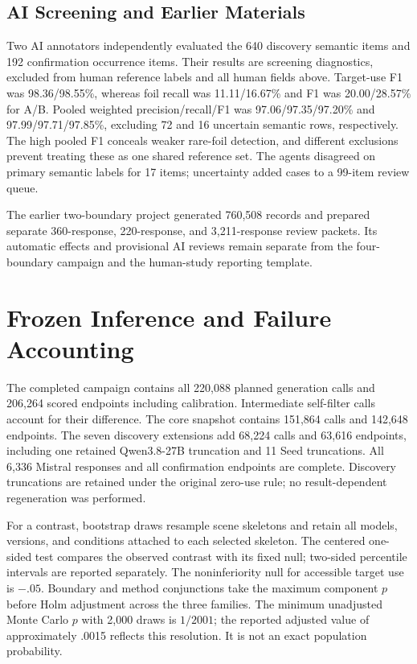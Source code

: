 \subsection{AI Screening and Earlier Materials}
Two AI annotators independently evaluated the 640 discovery semantic items and 192 confirmation occurrence items. Their results are screening diagnostics, excluded from human reference labels and all human fields above. Target-use F1 was 98.36/98.55\%, whereas foil recall was 11.11/16.67\% and F1 was 20.00/28.57\% for A/B. Pooled weighted precision/recall/F1 was 97.06/97.35/97.20\% and 97.99/97.71/97.85\%, excluding 72 and 16 uncertain semantic rows, respectively. The high pooled F1 conceals weaker rare-foil detection, and different exclusions prevent treating these as one shared reference set. The agents disagreed on primary semantic labels for 17 items; uncertainty added cases to a 99-item review queue.


The earlier two-boundary project generated 760,508 records and prepared separate 360-response, 220-response, and 3,211-response review packets. Its automatic effects and provisional AI reviews remain separate from the four-boundary campaign and the human-study reporting template.

\section{Frozen Inference and Failure Accounting}
\label{app:accounting}
The completed campaign contains all 220,088 planned generation calls and 206,264 scored endpoints including calibration. Intermediate self-filter calls account for their difference. The core snapshot contains 151,864 calls and 142,648 endpoints. The seven discovery extensions add 68,224 calls and 63,616 endpoints, including one retained Qwen3.8-27B truncation and 11 Seed truncations. All 6,336 Mistral responses and all confirmation endpoints are complete. Discovery truncations are retained under the original zero-use rule; no result-dependent regeneration was performed.

For a contrast, bootstrap draws resample scene skeletons and retain all models, versions, and conditions attached to each selected skeleton. The centered one-sided test compares the observed contrast with its fixed null; two-sided percentile intervals are reported separately. The noninferiority null for accessible target use is ${-}.05$. Boundary and method conjunctions take the maximum component $p$ before Holm adjustment across the three families. The minimum unadjusted Monte Carlo $p$ with 2,000 draws is $1/2001$; the reported adjusted value of approximately .0015 reflects this resolution. It is not an exact population probability.

